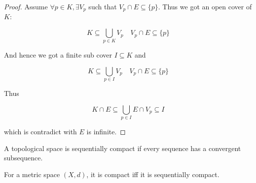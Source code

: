 \begin{proof}
    Assume $\forall p \in K, \exists V_p$ such that $V_p \cap E \subseteq \{ p \}$. Thus we got
    an open cover of $K$:

    \[
        K \subseteq \bigcup_{p \in K} V_p \quad V_p \cap E \subseteq \{p\}
    \]

    And hence we got a finite sub cover $I \subseteq K$ and 


    \[
        K \subseteq \bigcup_{p \in I} V_p \quad V_p \cap E \subseteq \{p\}
    \]

    Thus

    \[
        K \cap E \subseteq \bigcup_{p \in I} E \cap V_p \subseteq I
    \]

    which is contradict with $E$ is infinite.
\end{proof}

\begin{definition}
    A topological space is sequentially compact if every sequence has a convergent subsequence.
\end{definition}

\begin{thm}
    For a metric space $(X,d)$, it is compact iff it is sequentially compact.
\end{thm}

